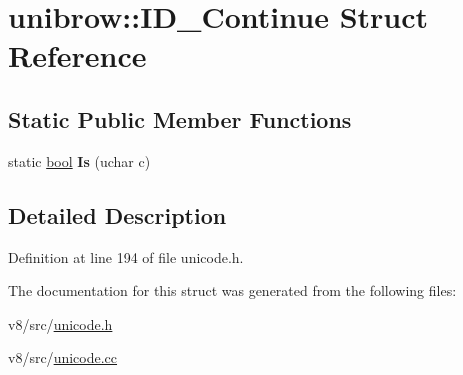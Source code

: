 \hypertarget{structunibrow_1_1ID__Continue}{}\section{unibrow\+:\+:I\+D\+\_\+\+Continue Struct Reference}
\label{structunibrow_1_1ID__Continue}
\subsection*{Static Public Member Functions}
\begin{DoxyCompactItemize}
\item 
\mbox{\label{structunibrow_1_1ID__Continue_aa09004a6b7276d233464403cb98e338c}} 
static \mbox{\hyperlink{classbool}{bool}} {\bfseries Is} (uchar c)
\end{DoxyCompactItemize}


\subsection{Detailed Description}


Definition at line 194 of file unicode.\+h.



The documentation for this struct was generated from the following files\+:\begin{DoxyCompactItemize}
\item 
v8/src/\mbox{\hyperlink{unicode_8h}{unicode.\+h}}\item 
v8/src/\mbox{\hyperlink{unicode_8cc}{unicode.\+cc}}\end{DoxyCompactItemize}

